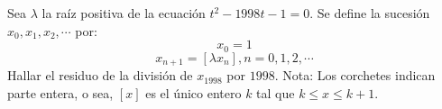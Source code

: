 Sea $\lambda$ la raíz positiva de la ecuación $t^2 - 1998t - 1 = 0$. Se define la sucesión $x_0, x_1, x_2, \cdots$ por:
\[ x_0 = 1 \]
\[ x_{n+1} = [\lambda x_n], n=0,1,2,\cdots \]
Hallar el residuo de la división de $x_1998$ por $1998$. \newline 
Nota: Los corchetes indican parte entera, o sea, $[x]$ es el único entero $k$ tal que $k \leq x \leq k+1$.
